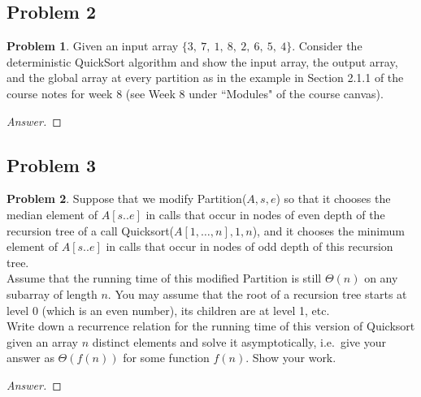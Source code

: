 \documentclass[11pt]{article}
\theoremstyle{definition}
\theoremstyle{definition}
\newtheorem{required}{Problem}
\theoremstyle{definition}
\begin{document}
\subsection{Problem 2}
\begin{required}
Given an input array $\{3,~7,~1,~8,~2,~6,~5,~4\}$. Consider the deterministic QuickSort algorithm and show the input array, the output array, and the global array at every partition as in the example in Section 2.1.1 of the course notes for week 8 (see Week 8 under ``Modules" of the course canvas). 

\begin{proof}[Answer]
\end{proof}

\end{required}

\newpage
\subsection{Problem 3}
\begin{required}

Suppose that we modify {\sc Partition}($A,s,e$) so that it chooses the median element of $A[s..e]$ in calls that occur in nodes of even depth of the recursion tree of a call {\sc Quicksort}($A[1, \ldots, n],1, n$), and it chooses the minimum element of $A[s..e]$ in calls that occur in nodes of odd depth of this recursion tree. \\
  
\noindent Assume that the running time of this modified {\sc Partition} is still $\Theta(n)$ on any subarray of length $n$. You may assume that the root of a recursion tree starts at level $0$ (which is an even number), its children are at level 1, etc. \\
  
\noindent Write down a recurrence relation for the running time of this version of {\sc Quicksort} given an array $n$ distinct elements and solve it asymptotically, i.e.\ give your answer as $\Theta(f(n))$ for some function $f(n)$. Show your work.

\begin{proof}[Answer]
\end{proof}

\end{required}
\end{document}
